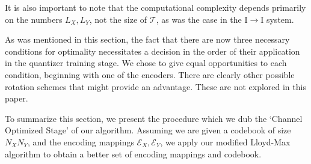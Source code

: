 It is also important to note that the computational complexity depends primarily on the numbers $L_X, L_Y$, not the size of $\mathcal T$, as was the case in the I$\rightarrow$I system.

As was mentioned in this section, the fact that there are now three necessary conditions for optimality necessitates a decision in the order of their application in the quantizer training stage. We chose to give equal opportunities to each condition, beginning with one of the encoders. There are clearly other possible rotation schemes that might provide an advantage. These are not explored in this paper.

To summarize this section, we present the procedure which we dub the `Channel Optimized Stage' of our algorithm. Assuming we are given a codebook of size $N_X N_Y$, and the encoding mappings $\mathcal E_X, \mathcal E_Y$, we apply our modified Lloyd-Max algorithm to obtain a better set of encoding mappings and codebook.

